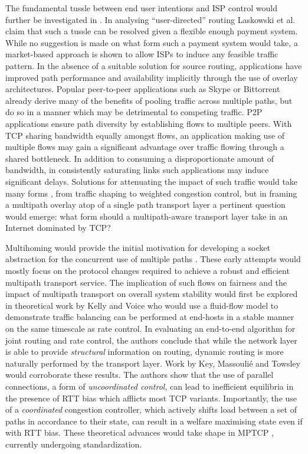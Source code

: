The fundamental tussle between end user intentions and \ac{ISP} control would further be investigated in \cite{Laskowski:2008p244}.
In analysing ``user-directed'' routing Laskowski et al. claim that such a tussle can be resolved given a flexible enough payment system.
While no suggestion is made on what form such a payment system would take, a market-based approach is shown to allow \acp{ISP} to induce any feasible traffic pattern.
In the absence of a suitable solution for source routing, applications have improved path performance and availability implicitly through the use of overlay architectures.
Popular peer-to-peer applications such as Skype or Bittorrent already derive many of the benefits of pooling traffic across multiple paths, but do so in a manner which may be detrimental to competing traffic.
\ac{P2P} applications ensure path diversity by establishing flows to multiple peers.
With \ac{TCP} sharing bandwidth equally amongst flows, an application making use of multiple flows may gain a significant advantage over traffic flowing through a shared bottleneck.
In addition to consuming a disproportionate amount of bandwidth, in consistently saturating links such applications may induce significant delays.
Solutions for attenuating the impact of such traffic would take many forms \cite{Peterson:2009p178}, from traffic shaping to weighted congestion control, but in framing a multipath overlay atop of a single path transport layer a pertinent question would emerge: what form should a multipath-aware transport layer take in an Internet dominated by \ac{TCP}?

Multihoming would provide the initial motivation for developing a socket abstraction for the concurrent use of multiple paths \cite{Huitema:1995p543,Hsieh:2002p538,Iyengar:2006p542}.
These early attempts would mostly focus on the protocol changes required to achieve a robust and efficient multipath transport service.
The implication of such flows on fairness and the impact of multipath transport on overall system stability would first be explored in theoretical work by Kelly and Voice \cite{Kelly:2005p140} who would use a fluid-flow model to demonstrate traffic balancing can be performed at end-hosts in a stable manner on the same timescale as rate control.
In evaluating an end-to-end algorithm for joint routing and rate control, the authors conclude that while the network layer is able to provide \emph{structural} information on routing, dynamic routing is more naturally performed by the transport layer.
Work by Key, Massouli\'{e} and Towsley \cite{Key:2007p130} would corroborate these results. 
The authors show that the use of parallel connections, a form of \emph{uncoordinated control}, can lead to inefficient equilibria in the presence of \ac{RTT} bias which afflicts most \ac{TCP} variants. Importantly, the use of a \emph{coordinated} congestion controller, which actively shifts load between a set of paths in accordance to their state, can result in a welfare maximising state even if with \ac{RTT} bias.
These theoretical advances would take shape in \ac{MPTCP} \cite{Wischik:2011p540}, currently undergoing standardization.

